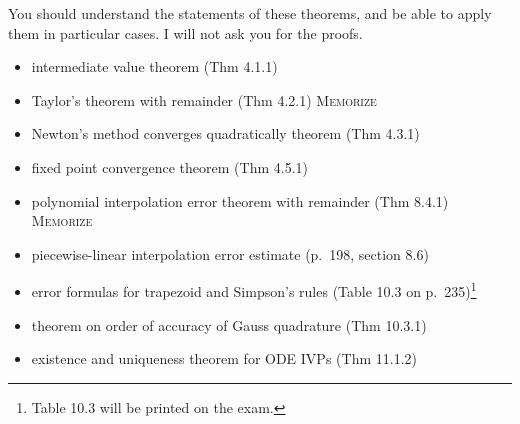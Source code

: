 \documentclass[12pt]{amsart}
\begin{document}
  You should understand the statements of these theorems, and be able to apply them in particular cases.  I will not ask you for the proofs.
  \begin{itemize}
  \item intermediate value theorem (Thm 4.1.1)
  \item Taylor's theorem with remainder (Thm 4.2.1) \qquad  \textsc{Memorize}
  \item Newton's method converges quadratically theorem (Thm 4.3.1)
  \item fixed point convergence theorem (Thm 4.5.1)
  \item polynomial interpolation error theorem with remainder (Thm 8.4.1) \qquad  \textsc{Memorize}
  \item piecewise-linear interpolation error estimate (p.~198, section 8.6)
  \item error formulas for trapezoid and Simpson's rules (Table 10.3 on p.~235)\footnote{Table 10.3 will be printed on the exam.}
  \item theorem on order of accuracy of Gauss quadrature (Thm 10.3.1)
  \item existence and uniqueness theorem for ODE IVPs (Thm 11.1.2)
  \end{itemize}
\end{document}
